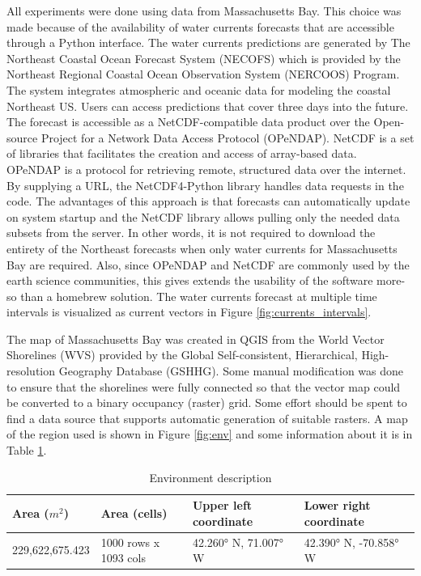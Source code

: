 \documentclass{tamuccthesis}
\begin{document}
All experiments were done using data from Massachusetts Bay. This choice was made because of the availability of water currents forecasts that are accessible through a Python interface. The water currents predictions are generated by The Northeast Coastal Ocean Forecast System (NECOFS) which is provided by the Northeast Regional Coastal Ocean Observation System (NERCOOS) Program. The system integrates atmospheric and oceanic data for modeling the coastal Northeast US. Users can access predictions that cover three days into the future. The forecast is accessible as a NetCDF-compatible data product over the Open-source Project for a Network Data Access Protocol (OPeNDAP). NetCDF is a set of libraries that facilitates the creation and access of array-based data. OPeNDAP is a protocol for retrieving remote, structured data over the internet. By supplying a URL, the NetCDF4-Python library handles data requests in the code. The advantages of this approach is that forecasts can automatically update on system startup and the NetCDF library allows pulling only the needed data subsets from the server. In other words, it is not required to download the entirety of the Northeast forecasts when only water currents for Massachusetts Bay are required. Also, since OPeNDAP and NetCDF are commonly used by the earth science communities, this gives extends the usability of the software more-so than a homebrew solution. The water currents forecast at multiple time intervals is visualized as current vectors in Figure \ref{fig:currents_intervals}.

The map of Massachusetts Bay was created in QGIS from the World Vector Shorelines (WVS) provided by the Global Self-consistent, Hierarchical, High-resolution Geography Database (GSHHG). Some manual modification was done to ensure that the shorelines were fully connected so that the vector map could be converted to a binary occupancy (raster) grid. Some effort should be spent to find a data source that supports automatic generation of suitable rasters. A map of the region used is shown in Figure \ref{fig:env} and some information about it is in Table \ref{tbl:env_desc}.

\begin{table}[H]\small
    \begin{tabular}{|l|l|l|l|}
\hline
Area ($m^2$) & Area (cells) & Upper left coordinate & Lower right coordinate \\
\hline
229,622,675.423 & 1000 rows x 1093 cols  &  42.260° N, 71.007° W & 42.390° N, -70.858° W \\
\hline
    \end{tabular}
    \caption{Environment description}
    \label{tbl:env_desc}
\end{table}
\end{document}
